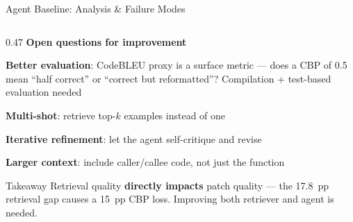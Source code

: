 \documentclass[aspectratio=169,10pt]{beamer}
\begin{document}
\begin{frame}{Agent Baseline: Analysis \& Failure Modes}
\begin{columns}[T]
\begin{column}{0.47\textwidth}
  \vspace{0.5em}
  \textbf{Open questions for improvement}
  \begin{itemize}\setlength{\itemsep}{3pt}
    {\scriptsize
    \item \textbf{Better evaluation}: CodeBLEU proxy is a surface metric —
          does a CBP of 0.5 mean ``half correct'' or ``correct but reformatted''?
          Compilation + test-based evaluation needed
    \item \textbf{Multi-shot}: retrieve top-$k$ examples instead of one
    \item \textbf{Iterative refinement}: let the agent self-critique and revise
    \item \textbf{Larger context}: include caller/callee code, not just the function}
  \end{itemize}

  \vspace{0.5em}
  \begin{alertblock}{\scriptsize Takeaway}
    \scriptsize Retrieval quality \textbf{directly impacts} patch quality —
    the 17.8~pp retrieval gap causes a 15~pp CBP loss.
    Improving both retriever and agent is needed.
  \end{alertblock}

\end{column}
\end{columns}
\end{frame}




\end{document}
